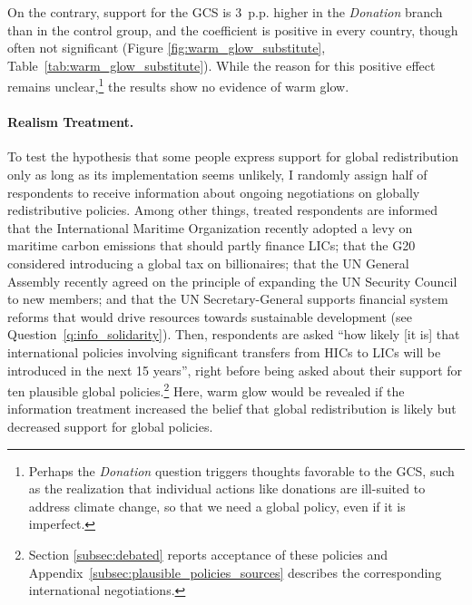 \documentclass[12pt,english]{article}
\begin{document}
On the contrary, support for the GCS is 3~p.p. higher in the \textit{Donation} branch than in the control group, and the coefficient is positive in every country, though often not significant (Figure \ref{fig:warm_glow_substitute}, Table~\ref{tab:warm_glow_substitute}). While the reason for this positive effect remains unclear,\footnote{Perhaps the \textit{Donation} question triggers thoughts favorable to the GCS, such as the realization that individual actions like donations are ill-suited to address climate change, so that we need a global policy, even if it is imperfect.} 
the results show no evidence of warm glow.

\paragraph{Realism Treatment.}

To test the hypothesis that some people express support for global redistribution only as long as its implementation seems unlikely, I randomly assign half of respondents to receive information about ongoing negotiations on globally redistributive policies. Among other things, treated respondents are informed that the International Maritime Organization recently adopted a levy on maritime carbon emissions that should partly finance LICs; that the G20 considered introducing a global tax on billionaires; that the UN General Assembly recently agreed on the principle of expanding the UN Security Council to new members; and that the UN Secretary-General supports financial system reforms that would drive resources towards sustainable development (see Question~\ref{q:info_solidarity}). 
Then, respondents are asked ``how likely [it is] that international policies involving significant transfers from HICs to LICs will be introduced in the next 15 years'', right before being asked about their support for ten plausible global policies.\footnote{Section \ref{subsec:debated} reports acceptance of these policies and Appendix~\ref{subsec:plausible_policies_sources} describes the corresponding international negotiations.}  Here, warm glow would be revealed if the information treatment increased the belief that global redistribution is likely but decreased support for global policies. %
\end{document}
